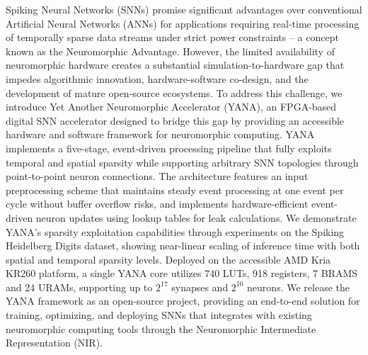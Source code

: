Spiking Neural Networks (SNNs) promise significant advantages over conventional Artificial Neural Networks (ANNs) for applications requiring real-time processing of temporally sparse data streams under strict power constraints -- a concept known as the Neuromorphic Advantage. However, the limited availability of neuromorphic hardware creates a substantial simulation-to-hardware gap that impedes algorithmic innovation, hardware-software co-design, and the development of mature open-source ecosystems. To address this challenge, we introduce Yet Another Neuromorphic Accelerator (YANA), an FPGA-based digital SNN accelerator designed to bridge this gap by providing an accessible hardware and software framework for neuromorphic computing.
YANA implements a five-stage, event-driven processing pipeline that fully exploits temporal and spatial sparsity while supporting arbitrary SNN topologies through point-to-point neuron connections. The architecture features an input preprocessing scheme that maintains steady event processing at one event per cycle without buffer overflow risks, and implements hardware-efficient event-driven neuron updates using lookup tables for leak calculations. We demonstrate YANA's sparsity exploitation capabilities through experiments on the Spiking Heidelberg Digits dataset, showing near-linear scaling of inference time with both spatial and temporal sparsity levels. Deployed on the accessible AMD Kria KR260 platform, a single YANA core utilizes 740 LUTs, 918 registers, 7 BRAMS and 24 URAMs, supporting up to $2^{17}$ synapses and $2^{10}$ neurons. We release the YANA framework as an open-source project, providing an end-to-end solution for training, optimizing, and deploying SNNs that integrates with existing neuromorphic computing tools through the Neuromorphic Intermediate Representation (NIR).